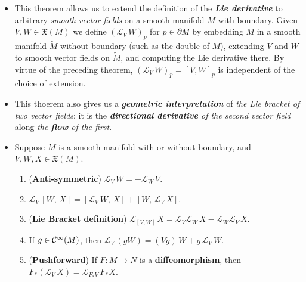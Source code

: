 \documentclass[11pt]{article}
\begin{document}
\begin{itemize}
\begin{proof}
\begin{itemize}
\item $p \in \text{supp}(V)$. Because $\text{supp}V$ is the closure of $\cR(V)$, it follows by continuity from Case 1 that $(\mathscr{L}_{V}\,W)_{p} = [V, W]_p$  for $p \in \text{supp}(V)$.

\item $p \in M \setminus \text{supp}(V)$. In this case, $V\equiv 0$ on a neighborhood of $p$. On the one hand, this implies that $\theta_t$ is equal to the identity map in a neighborhood of $p$ for all $t$, so $d\paren{\theta_{-t}}_{\theta_{t}(p)}\paren{W_{\theta_t(p)}} = W_p$, which implies  $(\mathscr{L}_{V}\,W)_{p} = 0$. On the other
hand, $[V, W]_p =0$ by formula \eqref{eqn: lie_bracket}. \qed
\end{itemize}
\end{proof}



\item \begin{remark}
This theorem allows us to extend the definition of the \emph{\textbf{Lie derivative}} to arbitrary \emph{smooth vector fields} on a smooth manifold $M$ with boundary. Given $V, W \in \mathfrak{X}(M)$ we define $(\mathscr{L}_{V}\,W)_{p}$ for $p \in \partial M$ by embedding $M$ in a smooth manifold $\widetilde{M}$ without boundary (such as the double of $M$), extending $V$ and $W$ to smooth vector fields on $\widetilde{M}$, and computing the Lie derivative there. By virtue of the preceding theorem,
$(\mathscr{L}_{V}\,W)_{p} = [V, W]_p$ is independent of the choice of extension.
\end{remark}

\item \begin{remark} This thoerem also gives us a \emph{\textbf{geometric interpretation}} of \emph{the Lie bracket of two vector fields}: it is the \emph{\textbf{directional derivative} of the second vector field} along \emph{the \textbf{flow} of the first}. 
\end{remark}

\item \begin{corollary}
Suppose $M$ is a smooth manifold with or without boundary, and $V, W, X \in \mathfrak{X}(M)$.
\begin{enumerate}
\item (\textbf{Anti-symmetric}) $\mathscr{L}_{V}\,W = -\mathscr{L}_{W}\,V$.
\item $\mathscr{L}_{V}\,[W,\, X] =  [\mathscr{L}_{V}\,W, \,X] + [W,\, \mathscr{L}_{V}\,X]$.
\item (\textbf{Lie Bracket definition}) $\mathscr{L}_{[V, W]}\,X = \mathscr{L}_{V}\mathscr{L}_{W}\,X - \mathscr{L}_{W}\mathscr{L}_{V}\,X$.
\item If $g \in {\mathcal C}^{\infty}(M)$, then $\mathscr{L}_{V}\,(gW) = (Vg)\,W + g\,\mathscr{L}_{V}\,W$.
\item (\textbf{Pushforward}) If $F: M \rightarrow N$ is a \textbf{diffeomorphism}, then $F_{*}(\mathscr{L}_{V}\,X) = \mathscr{L}_{F_{*}V}\,F_{*}X$.
\end{enumerate}
\end{corollary}


\end{itemize}
\end{document}
